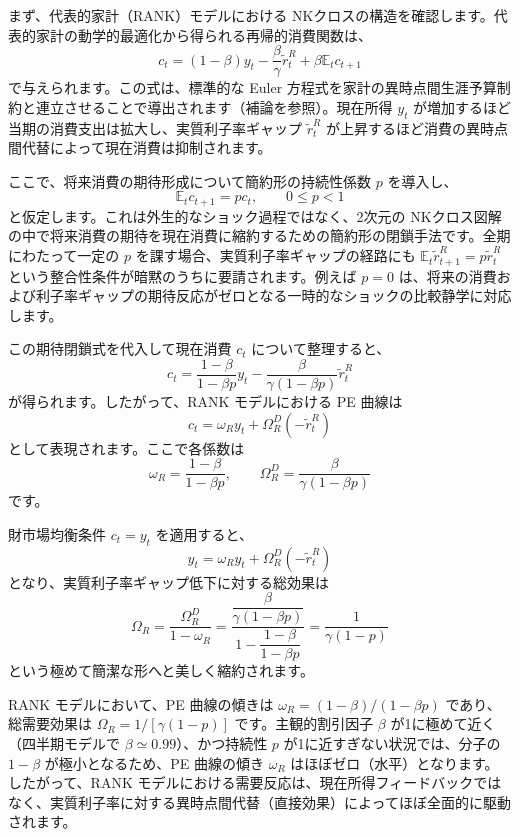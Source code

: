 \documentclass[
  japanese,
  lualatex,
  ja=standard,
  12pt,
  a4paper]{ltjsarticle}
\begin{document}
まず、代表的家計（RANK）モデルにおける
NKクロスの構造を確認します。代表的家計の動学的最適化から得られる再帰的消費関数は、
\[
c_t = (1-\beta)y_t - \frac{\beta}{\gamma}\widetilde{r}_t^R + \beta \mathbb{E}_t c_{t+1}
\] で与えられます。この式は、標準的な Euler
方程式を家計の異時点間生涯予算制約と連立させることで導出されます（補論を参照）。現在所得
\(y_t\) が増加するほど当期の消費支出は拡大し、実質利子率ギャップ
\(\widetilde{r}_t^R\)
が上昇するほど消費の異時点間代替によって現在消費は抑制されます。

ここで、将来消費の期待形成について簡約形の持続性係数 \(p\) を導入し、 \[
\mathbb{E}_t c_{t+1} = p c_t, \qquad 0 \leq p < 1
\] と仮定します。これは外生的なショック過程ではなく、2次元の
NKクロス図解の中で将来消費の期待を現在消費に縮約するための簡約形の閉鎖手法です。全期にわたって一定の
\(p\) を課す場合、実質利子率ギャップの経路にも
\(\mathbb{E}_t \widetilde{r}_{t+1}^R = p \widetilde{r}_t^R\)
という整合性条件が暗黙のうちに要請されます。例えば \(p=0\)
は、将来の消費および利子率ギャップの期待反応がゼロとなる一時的なショックの比較静学に対応します。

この期待閉鎖式を代入して現在消費 \(c_t\) について整理すると、 \[
c_t = \frac{1-\beta}{1-\beta p} y_t - \frac{\beta}{\gamma(1-\beta p)}\widetilde{r}_t^R
\] が得られます。したがって、RANK モデルにおける PE 曲線は \[
c_t = \omega_R y_t + \Omega_R^D(-\widetilde{r}_t^R)
\] として表現されます。ここで各係数は \[
\omega_R = \frac{1-\beta}{1-\beta p}, \qquad \Omega_R^D = \frac{\beta}{\gamma(1-\beta p)}
\] です。


財市場均衡条件 \(c_t = y_t\) を適用すると、 \[
y_t = \omega_R y_t + \Omega_R^D(-\widetilde{r}_t^R)
\] となり、実質利子率ギャップ低下に対する総効果は \[
\Omega_R = \frac{\Omega_R^D}{1-\omega_R} = \frac{\dfrac{\beta}{\gamma(1-\beta p)}}{1 - \dfrac{1-\beta}{1-\beta p}} = \frac{1}{\gamma(1-p)}
\] という極めて簡潔な形へと美しく縮約されます。


\begin{tcolorbox}[enhanced jigsaw, arc=.35mm, bottomrule=.15mm, bottomtitle=1mm, breakable, colback=white, colbacktitle=quarto-callout-note-color!10!white, colframe=quarto-callout-note-color-frame, coltitle=black, left=2mm, leftrule=.75mm, opacityback=0, opacitybacktitle=0.6, rightrule=.15mm, title=\textcolor{quarto-callout-note-color}{\faInfo}\hspace{0.5em}{RANK の要点}, titlerule=0mm, toprule=.15mm, toptitle=1mm]

RANK モデルにおいて、PE 曲線の傾きは
\(\omega_R = (1-\beta)/(1-\beta p)\) であり、総需要効果は
\(\Omega_R = 1/[\gamma(1-p)]\) です。主観的割引因子 \(\beta\)
が1に極めて近く（四半期モデルで \(\beta \simeq 0.99\)）、かつ持続性
\(p\) が1に近すぎない状況では、分子の \(1-\beta\) が極小となるため、PE
曲線の傾き \(\omega_R\) はほぼゼロ（水平）となります。したがって、RANK
モデルにおける需要反応は、現在所得フィードバックではなく、実質利子率に対する異時点間代替（直接効果）によってほぼ全面的に駆動されます。

\end{tcolorbox}
\end{document}
